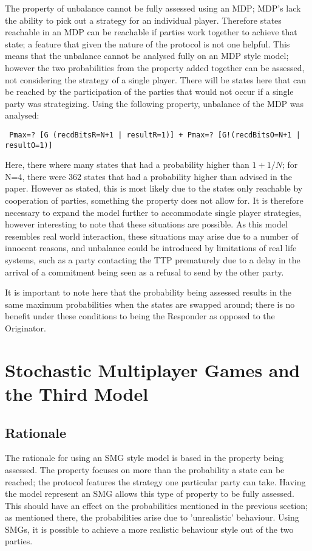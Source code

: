 \documentclass{l4proj}
\begin{document}
The property of unbalance cannot be fully assessed using an MDP; MDP's lack the ability to pick out a strategy for an individual player. Therefore states reachable in an MDP can be reachable if parties work together to achieve that state; a feature that given the nature of the protocol is not one helpful. This means that the unbalance cannot be analysed fully on an MDP style model; however the two probabilities from the property added together can be assessed, not considering the strategy of a single player. There will be states here that can be reached by the participation of the parties that would not occur if a single party was strategizing. Using the following property, unbalance of the MDP was analysed:
\begin{lstlisting}
 Pmax=? [G (recdBitsR=N+1 | resultR=1)] + Pmax=? [G!(recdBitsO=N+1 | resultO=1)]
\end{lstlisting}

Here, there where many states that had a probability higher than $1+1/N$; for N=4, there were 362 states that had a probability higher than advised in the paper. However as stated, this is most likely due to the states only reachable by cooperation of parties, something the property does not allow for. It is therefore necessary to expand the model further to accommodate single player strategies, however interesting to note that these situations are possible. As this model resembles real world interaction, these situations may arise due to a number of innocent reasons, and unbalance could be introduced by limitations of real life systems, such as a party contacting the TTP prematurely due to a delay in the arrival of a commitment being seen as a refusal to send by the other party.


It is important to note here that the probability being assessed results in the same maximum probabilities when the states are swapped around; there is no benefit under these conditions to being the Responder as opposed to the Originator.

\chapter{Stochastic Multiplayer Games and the Third Model}

\section{Rationale}

The rationale for using an SMG style model is based in the property being assessed. The property focuses on more than the probability a state can be reached; the protocol features the strategy one particular party can take. Having the model represent an SMG allows this type of property to be fully assessed.
This should have an effect on the probabilities mentioned in the previous section; as mentioned there, the probabilities arise due to 'unrealistic' behaviour. Using SMGs, it is possible to achieve a more realistic behaviour style out of the two parties.
\end{document}
